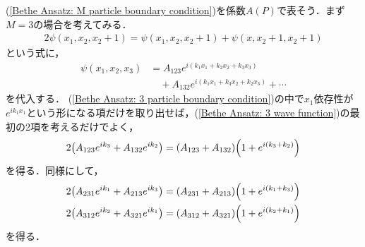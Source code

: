\documentclass[dvipdfmx,9pt]{beamer}
\numberwithin{equation}{section}
\begin{document}
\begin{frame}
    (\ref{Bethe Ansatz: M particle boundary condition})を係数$A(P)$で表そう．まず$M=3$の場合を考えてみる．
    \begin{align}
        2\psi(x_1,x_2,x_2+1) = \psi(x_1,x_2,x_2+1) + \psi(x,x_2+1,x_2+1)
        \label{Bethe Ansatz: 3 particle boundary condition}
    \end{align}
    という式に，
    \begin{align}
        \psi(x_1,x_2,x_3) &\nonumber
        = A_{123}e^{i(k_1x_1+k_2x_2+k_3x_3)}
        \\ & \quad
        + A_{132}e^{i(k_1x_1 + k_3x_2 + k_2x_3)} + \cdots
        \label{Bethe Ansatz: 3 wave function}
    \end{align}
    を代入する．
    (\ref{Bethe Ansatz: 3 particle boundary condition})の中で$x_1$依存性が$e^{ik_1 x_1}$という形になる項だけを取り出せば，(\ref{Bethe Ansatz: 3 wave function})の最初の2項を考えるだけでよく，
    \begin{align}
        2\qty(A_{123}e^{ik_3} + A_{132}e^{ik_2}) = (A_{123} + A_{132})\qty(1 + e^{i(k_3+k_2)})
    \end{align}
    を得る．同様にして，
    \begin{align}
        2\qty(A_{231}e^{ik_1}+A_{213}e^{ik_3}) = (A_{231}+A_{213})\qty(1+e^{i(k_1+k_3)})
        \\
        2\qty(A_{312}e^{ik_2}+A_{321}e^{ik_1}) = (A_{312}+A_{321})\qty(1+e^{i(k_2+k_1)})
    \end{align}
    を得る．
\end{frame}
\end{document}
